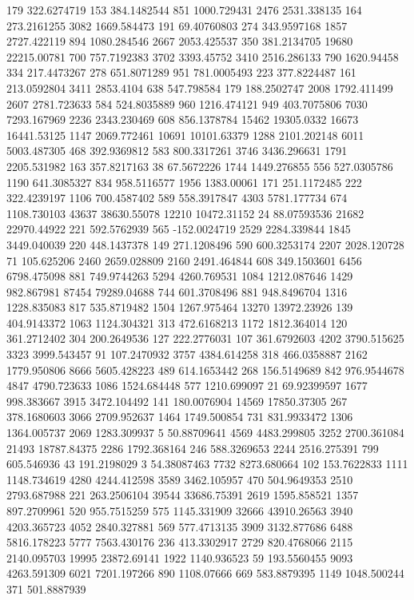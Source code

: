 179	322.6274719
153	384.1482544
851	1000.729431
2476	2531.338135
164	273.2161255
3082	1669.584473
191	69.40760803
274	343.9597168
1857	2727.422119
894	1080.284546
2667	2053.425537
350	381.2134705
19680	22215.00781
700	757.7192383
3702	3393.45752
3410	2516.286133
790	1620.94458
334	217.4473267
278	651.8071289
951	781.0005493
223	377.8224487
161	213.0592804
3411	2853.4104
638	547.798584
179	188.2502747
2008	1792.411499
2607	2781.723633
584	524.8035889
960	1216.474121
949	403.7075806
7030	7293.167969
2236	2343.230469
608	856.1378784
15462	19305.0332
16673	16441.53125
1147	2069.772461
10691	10101.63379
1288	2101.202148
6011	5003.487305
468	392.9369812
583	800.3317261
3746	3436.296631
1791	2205.531982
163	357.8217163
38	67.5672226
1744	1449.276855
556	527.0305786
1190	641.3085327
834	958.5116577
1956	1383.00061
171	251.1172485
222	322.4239197
1106	700.4587402
589	558.3917847
4303	5781.177734
674	1108.730103
43637	38630.55078
12210	10472.31152
24	88.07593536
21682	22970.44922
221	592.5762939
565	-152.0024719
2529	2284.339844
1845	3449.040039
220	448.1437378
149	271.1208496
590	600.3253174
2207	2028.120728
71	105.625206
2460	2659.028809
2160	2491.464844
608	349.1503601
6456	6798.475098
881	749.9744263
5294	4260.769531
1084	1212.087646
1429	982.867981
87454	79289.04688
744	601.3708496
881	948.8496704
1316	1228.835083
817	535.8719482
1504	1267.975464
13270	13972.23926
139	404.9143372
1063	1124.304321
313	472.6168213
1172	1812.364014
120	361.2712402
304	200.2649536
127	222.2776031
107	361.6792603
4202	3790.515625
3323	3999.543457
91	107.2470932
3757	4384.614258
318	466.0358887
2162	1779.950806
8666	5605.428223
489	614.1653442
268	156.5149689
842	976.9544678
4847	4790.723633
1086	1524.684448
577	1210.699097
21	69.92399597
1677	998.383667
3915	3472.104492
141	180.0076904
14569	17850.37305
267	378.1680603
3066	2709.952637
1464	1749.500854
731	831.9933472
1306	1364.005737
2069	1283.309937
5	50.88709641
4569	4483.299805
3252	2700.361084
21493	18787.84375
2286	1792.368164
246	588.3269653
2244	2516.275391
799	605.546936
43	191.2198029
3	54.38087463
7732	8273.680664
102	153.7622833
1111	1148.734619
4280	4244.412598
3589	3462.105957
470	504.9649353
2510	2793.687988
221	263.2506104
39544	33686.75391
2619	1595.858521
1357	897.2709961
520	955.7515259
575	1145.331909
32666	43910.26563
3940	4203.365723
4052	2840.327881
569	577.4713135
3909	3132.877686
6488	5816.178223
5777	7563.430176
236	413.3302917
2729	820.4768066
2115	2140.095703
19995	23872.69141
1922	1140.936523
59	193.5560455
9093	4263.591309
6021	7201.197266
890	1108.07666
669	583.8879395
1149	1048.500244
371	501.8887939

